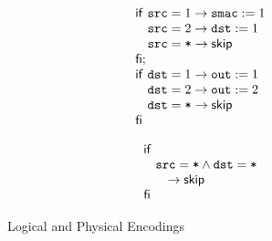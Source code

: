 \begin{figure}
  \begin{minipage}[t]{0.23\textwidth}
    \begin{framed}

      \[
        \begin{array}{l}
          \IF~\var{src} = 1 \to \var{smac} := 1 \\
          \phantom{\IF}~\var{src} = 2 \to \var{dst} := 1\\
          \phantom{\IF}~\var{src} = \var{*} \to \SKIP \\
          \ENDIF ; \\
          \IF~\var{dst} = 1 \to \var{out} := 1 \\
          \phantom{\IF}~\var{dst} = 2 \to \var{out} := 2 \\
          \phantom{\IF}~\var{dst} = \var{*} \to \SKIP \\
          \ENDIF
        \end{array}
      \]
    \end{framed}
  \end{minipage}  \begin{minipage}[t]{0.23\textwidth}
    \begin{framed}
      \[
        \begin{array}{l}
          \IF~\\
          \phantom{\IF}~\var{src} = \var{*} \wedge \var{dst} = \var{*}\\
          \phantom{\IF}~~~\to \SKIP \\
          \ENDIF 
        \end{array}
      \]
    \end{framed}
  \end{minipage}
  \caption{Logical and Physical Encodings}
\end{figure}








